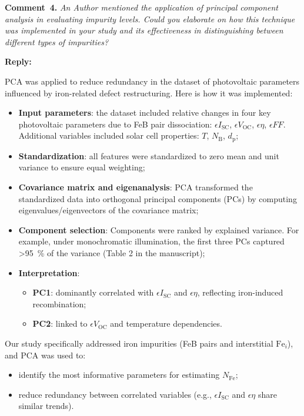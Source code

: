 \documentclass[a4paper,fleqn]{cas-sc}
\begin{document}
\vspace{1cm}
\noindent
\textcolor[rgb]{0.00,0.50,1.00}{\textbf{Comment~4.}}
\emph{An Author mentioned the application of principal component analysis in evaluating impurity levels. Could you elaborate on how this technique was implemented in your study and its effectiveness in distinguishing between different types of impurities?}

\noindent
\textcolor[rgb]{0.51,0.00,0.00}{\textbf{Reply:}}

PCA was applied to reduce redundancy in the dataset of photovoltaic parameters influenced by iron-related defect restructuring. Here is how it was implemented:

\begin{itemize}
    \item \textbf{Input parameters}: the dataset included relative changes in four key photovoltaic parameters due to FeB pair dissociation: $\epsilon I_\mathrm{SC}$, $\epsilon V_\mathrm{OC}$, $\epsilon \eta$, $\epsilon FF$. Additional variables included solar cell properties: $T$, $N_\mathrm{B}$, $d_\mathrm{p}$;
    \item \textbf{Standardization}: all features were standardized to zero mean and unit variance to ensure equal weighting;
    \item \textbf{Covariance matrix and eigenanalysis}: PCA transformed the standardized data into orthogonal principal components (PCs) by computing eigenvalues/eigenvectors of the covariance matrix;
    \item \textbf{Component selection}: Components were ranked by explained variance. For example, under monochromatic illumination, the first three PCs captured >95~\% of the variance (Table 2 in the manuscript);
    \item \textbf{Interpretation}: 
    \begin{itemize}
    \item \textbf{PC1}: dominantly correlated with $\epsilon I_\mathrm{SC}$ and $\epsilon \eta$, reflecting iron-induced recombination;
    \item \textbf{PC2}: linked to $\epsilon V_\mathrm{OC}$ and temperature dependencies.
    \end{itemize}
\end{itemize}

Our study specifically addressed iron impurities (FeB pairs and interstitial $\mathrm{Fe}_i$), and PCA was used to:

\begin{itemize}
    \item identify the most informative parameters for estimating $N_\mathrm{Fe}$;
    \item reduce redundancy between correlated variables (e.g., $\epsilon I_\mathrm{SC}$ and $\epsilon \eta$ share similar trends).
\end{itemize}
\end{document}
